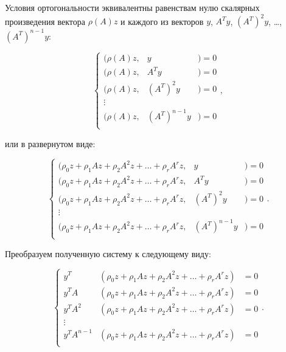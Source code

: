 Условия ортогональности эквивалентны равенствам нулю скалярных произведения вектора $\rho(A)z$ и каждого из векторов $y$, $A^T y$,
$\left ( A^T \right ) ^2 y$, \dots, $\left ( A^T \right )^{n-1} y$:

	$$
		\left \{
			\begin{array}{ccc}
				( \rho(A) z , & y                        & ) = 0\\
				( \rho(A) z , & A^T y                    & ) = 0\\
				( \rho(A) z , & \left ( A^T \right )^2 y & ) = 0\\
				\vdots \\
				( \rho(A) z , & \left ( A^T \right )^{n-1} y & ) = 0\\
			\end{array}
		\right .
		,
	$$

или в развернутом виде:

	$$
		\left \{
			\begin{array}{ccc}
				( \rho_0 z + \rho_1 A z + \rho_2 A^2 z + \dots + \rho_r A^r z , & y & ) = 0 \\
				( \rho_0 z + \rho_1 A z + \rho_2 A^2 z + \dots + \rho_r A^r z , & A^T y & ) = 0 \\
				( \rho_0 z + \rho_1 A z + \rho_2 A^2 z + \dots + \rho_r A^r z , & \left ( A^T \right )^2 y & ) = 0 \\
				\vdots \\
				( \rho_0 z + \rho_1 A z + \rho_2 A^2 z + \dots + \rho_r A^r z , & \left ( A^T \right )^{n-1} y & ) = 0 \\
			\end{array}
		\right .
		.
	$$

Преобразуем полученную систему к следующему виду:

	$$
		\left \{
			\begin{array}{ccc}
				y^T         & \left ( \rho_0 z + \rho_1 A z + \rho_2 A^2 z + \dots + \rho_r A^r z \right ) & = 0 \\
				y^T A       & \left ( \rho_0 z + \rho_1 A z + \rho_2 A^2 z + \dots + \rho_r A^r z \right ) & = 0 \\
				y^T A^2     & \left ( \rho_0 z + \rho_1 A z + \rho_2 A^2 z + \dots + \rho_r A^r z \right ) & = 0 \\
				\vdots \\
				y^T A^{n-1} & \left ( \rho_0 z + \rho_1 A z + \rho_2 A^2 z + \dots + \rho_r A^r z \right ) & = 0 \\
			\end{array}
		\right .
		.
	$$

